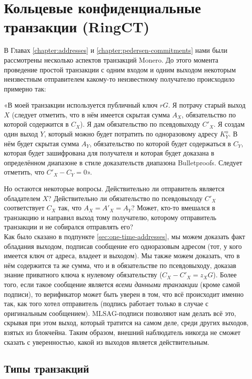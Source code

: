\chapter{Кольцевые конфиденциальные транзакции (RingCT)}
\label{chapter:transactions}

В Главах \ref{chapter:addresses} и \ref{chapter:pedersen-commitments} нами были рассмотрены несколько аспектов транзакций Monero. До этого момента проведение простой транзакции с одним входом и одним выходом некоторым неиз\-вестным отправителем какому-то неизвестному получателю происходило примерно так:

«В моей транзакции используется публичный ключ $r G$. Я потрачу старый выход $X$ (следует отметить, что в нём имеется скрытая сумма $A_X$, обязательство по которой содержится в $C_X$). Я дам обязательство по псевдовыходу $C'_X$. Я создам один выход $Y$, который можно будет потратить по одноразовому адресу $K^o_Y$. В нём будет скрытая сумма $A_Y$, обязательство по которой будет содержаться в $C_Y$, которая будет зашифрована для получателя и которая будет доказана в определённом диапазоне в стиле доказательств диапазона Bulletproofs. Следует отметить, что $C'_X - C_Y = 0$».

Но остаются некоторые вопросы. Действительно ли отправитель является обладателем $X$? Действительно ли обязательство по псевдовыходу $C'_X$ соответствует $C_X$ так, что $A_X = A'_X = A_Y$? Может, кто-то вмешался в транзакцию и направил выход тому получателю, которому отправитель транзакции и не собирался отправлять его?
\\

Как было сказано в подпункте \ref{sec:one-time-addresses}, мы можем доказать факт обладания выходом, подписав сообщение его одноразовым адресом (тот, у кого имеется ключ от адреса, владеет и выходом). Мы также можем доказать, что в нём содержится та же сумма, что и в обязательстве по псевдовыходу, доказав знание приватного ключа к нулевому обязательству ($C_X - C'_X = z_X G$). Более того, если такое сообщение является {\em всеми данными транзакции} (кроме самой подписи), то верификатор может быть уверен в том, что всё происходит именно так, как того хотел отправитель (подпись работает только в случае с оригинальным сообщением). MLSAG-подписи позволяют нам делать всё это, скрывая при этом выход, который тратится на самом деле, среди других выходов, взятых из блокчейна. Таким образом, внешний наблюдатель никогда не сможет сказать с уверенностью, какой из выходов является действительным.

\section{Типы транзакций}
\label{sec:transaction_types}

